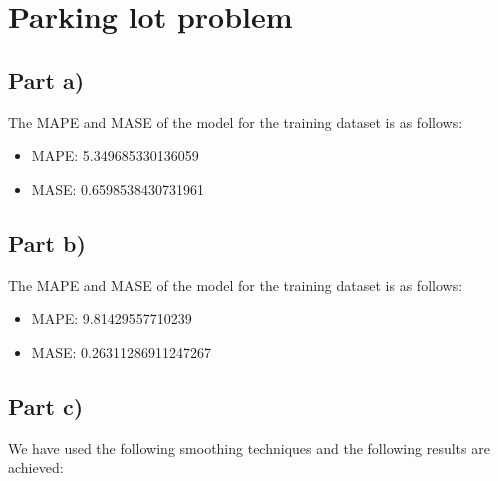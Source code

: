 \section{Parking lot problem}
\subsection{Part a)}
The MAPE and MASE of the model for the training dataset is as follows:
\begin{itemize}[noitemsep]
	\item MAPE:  5.349685330136059
	\item MASE:  0.6598538430731961
\end{itemize}


\subsection{Part b)}
The MAPE and MASE of the model for the training dataset is as follows:
\begin{itemize}[noitemsep]
	\item MAPE:  9.81429557710239
	\item MASE:  0.26311286911247267
\end{itemize}

\subsection{Part c)}
We have used the following smoothing techniques and the following results are achieved:
